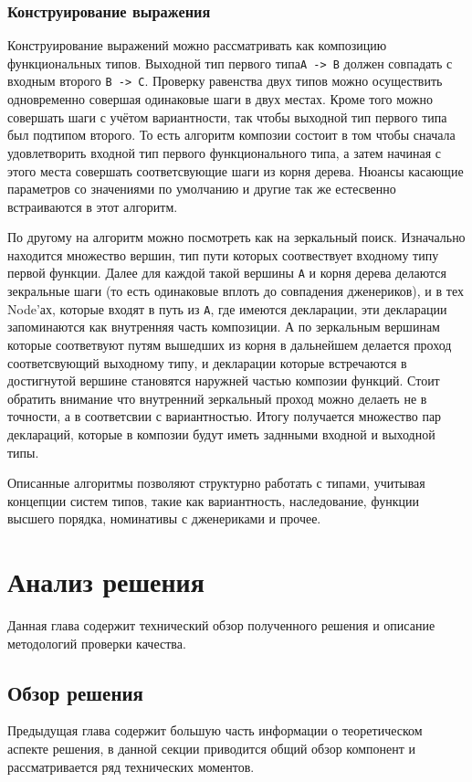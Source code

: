 \documentclass[times]{itmo-student-thesis}
\begin{document}
	\subsection{Конструирование выражения}
	Конструирование выражений можно рассматривать как композицию функциональных типов. Выходной тип первого типа\lstinline{A -> B} должен совпадать с входным второго \lstinline{B -> C}. Проверку равенства двух типов можно осуществить одновременно совершая одинаковые шаги в двух местах. Кроме того можно совершать шаги с учётом вариантности, так чтобы выходной тип первого типа был подтипом второго. То есть алгоритм композии состоит в том чтобы сначала удовлетворить входной тип первого функционального типа, а затем начиная с этого места совершать соответсвующие шаги из корня дерева. Нюансы касающие параметров со значениями по умолчанию и другие так же естесвенно встраиваются в этот алгоритм.
	
	По другому на алгоритм можно посмотреть как на зеркальный поиск. Изначально находится множество вершин, тип пути которых соотвествует входному типу первой функции. Далее для каждой такой вершины \lstinline{A} и корня дерева делаются зекральные шаги (то есть одинаковые вплоть до совпадения дженериков), и в тех Node'ах, которые входят в путь из \lstinline{A}, где имеются декларации, эти декларации запоминаются как внутренняя часть композиции. А по зеркальным вершинам которые соответвуют путям вышедших из корня в дальнейшем делается проход соответсвующий выходному типу, и декларации которые встречаются в достигнутой вершине становятся наружней частью композии функций. Стоит обратить внимание что внутренний зеркальный проход можно делаеть не в точности, а в соответсвии с вариантностью. Итогу получается множество пар деклараций, которые в композии будут иметь заднными входной и выходной типы.
	
	\chapterconclusion
	Описанные алгоритмы позволяют структурно работать с типами, учитывая концепции систем типов, такие как вариантность, наследование, функции высшего порядка, номинативы с дженериками и прочее.
	
	\chapter{Анализ решения}
	Данная глава содержит технический обзор полученного решения и описание методологий проверки качества.
	
	\section{Обзор решения}
	Предыдущая глава содержит большую часть информации о теоретическом аспекте решения, в данной секции приводится общий обзор компонент и рассматривается ряд технических моментов.
	
\end{document}
